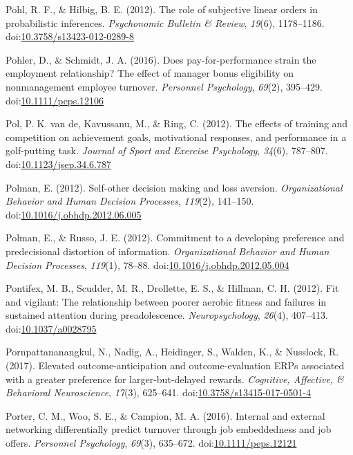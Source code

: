 \documentclass[english,man]{apa6}
\begin{document}
\hypertarget{ref-Pohl2012}{}
Pohl, R. F., \& Hilbig, B. E. (2012). The role of subjective linear
orders in probabilistic inferences. \emph{Psychonomic Bulletin \&
Review}, \emph{19}(6), 1178--1186.
doi:\href{https://doi.org/10.3758/s13423-012-0289-8}{10.3758/s13423-012-0289-8}

\hypertarget{ref-Pohler2016}{}
Pohler, D., \& Schmidt, J. A. (2016). Does pay-for-performance strain
the employment relationship? The effect of manager bonus eligibility on
nonmanagement employee turnover. \emph{Personnel Psychology},
\emph{69}(2), 395--429.
doi:\href{https://doi.org/10.1111/peps.12106}{10.1111/peps.12106}

\hypertarget{ref-VandePolP2012}{}
Pol, P. K. van de, Kavussanu, M., \& Ring, C. (2012). The effects of
training and competition on achievement goals, motivational responses,
and performance in a golf-putting task. \emph{Journal of Sport and
Exercise Psychology}, \emph{34}(6), 787--807.
doi:\href{https://doi.org/10.1123/jsep.34.6.787}{10.1123/jsep.34.6.787}

\hypertarget{ref-Polman2012}{}
Polman, E. (2012). Self-other decision making and loss aversion.
\emph{Organizational Behavior and Human Decision Processes},
\emph{119}(2), 141--150.
doi:\href{https://doi.org/10.1016/j.obhdp.2012.06.005}{10.1016/j.obhdp.2012.06.005}

\hypertarget{ref-Polman2012a}{}
Polman, E., \& Russo, J. E. (2012). Commitment to a developing
preference and predecisional distortion of information.
\emph{Organizational Behavior and Human Decision Processes},
\emph{119}(1), 78--88.
doi:\href{https://doi.org/10.1016/j.obhdp.2012.05.004}{10.1016/j.obhdp.2012.05.004}

\hypertarget{ref-Pontifex2012}{}
Pontifex, M. B., Scudder, M. R., Drollette, E. S., \& Hillman, C. H.
(2012). Fit and vigilant: The relationship between poorer aerobic
fitness and failures in sustained attention during preadolescence.
\emph{Neuropsychology}, \emph{26}(4), 407--413.
doi:\href{https://doi.org/10.1037/a0028795}{10.1037/a0028795}

\hypertarget{ref-Pornpattananangkul2017}{}
Pornpattananangkul, N., Nadig, A., Heidinger, S., Walden, K., \&
Nusslock, R. (2017). Elevated outcome-anticipation and
outcome-evaluation ERPs associated with a greater preference for
larger-but-delayed rewards. \emph{Cognitive, Affective, \& Behavioral
Neuroscience}, \emph{17}(3), 625--641.
doi:\href{https://doi.org/10.3758/s13415-017-0501-4}{10.3758/s13415-017-0501-4}

\hypertarget{ref-Porter2016}{}
Porter, C. M., Woo, S. E., \& Campion, M. A. (2016). Internal and
external networking differentially predict turnover through job
embeddedness and job offers. \emph{Personnel Psychology}, \emph{69}(3),
635--672.
doi:\href{https://doi.org/10.1111/peps.12121}{10.1111/peps.12121}
\end{document}
